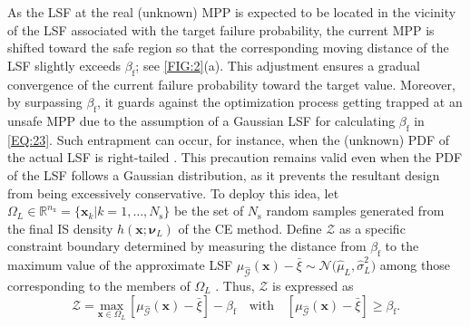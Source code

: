 \documentclass[preprint,3p]{elsarticle}
\begin{document}
\begin{linenumbers}
As the LSF at the real (unknown) MPP is expected to be located in the vicinity of the LSF associated with the target failure probability, the current MPP is shifted toward the safe region so that the corresponding moving distance of the LSF slightly exceeds $\beta_\text{f}$; see \cref{FIG:2}(a). This adjustment ensures a gradual convergence of the current failure probability toward the target value.
Moreover, by surpassing $\beta_\text{f}$, it guards against the optimization process getting trapped at an unsafe MPP due to the assumption of a Gaussian LSF for calculating $\beta_\text{f}$ in \cref{EQ:23}.
Such entrapment can occur, for instance, when the (unknown) PDF of the actual LSF is right-tailed \cite{VANHUYNH2023}. This precaution remains valid even when the PDF of the LSF follows a Gaussian distribution, as it prevents the resultant design from being excessively conservative. To deploy this idea, let $\Omega_L \in \mathbb{R}^{n_\text{x}}=\{\textbf{x}_k|k=1,\dots,N_\text{s}\}$ be the set of $N_\text{s}$ random samples generated from the final IS density ${h}\left(\textbf{x};\boldsymbol{\nu}_L\right)$ of the CE method. Define $\mathcal{Z}$ as a specific constraint boundary determined by measuring the distance from $\beta_\text{f}$ to the maximum value of the approximate LSF $\mu_{\widehat{\mathcal{G}}}(\textbf{x}) -\bar\xi\sim\mathcal{N}\bigl(\hat{\mu}_L,\hat{\sigma}_L^2\bigr)$ among those corresponding to the members of $\Omega_L$ \cite{VANHUYNH2023}. Thus, $\mathcal{Z}$ is expressed as
\begin{equation}
    \mathcal{Z} = \underset{\textbf{x}\in\Omega_L}{\text{max}}\,\left[\mu_{\widehat{\mathcal{G}}}(\textbf{x}) -\bar\xi\right]-\beta_\text{f} \quad\text{with} \quad\left[\mu_{\widehat{\mathcal{G}}}(\textbf{x}) -\bar\xi\right]\geq\beta_\text{f}.
    \label{EQ:24}
\end{equation}


\end{linenumbers}
\end{document}
